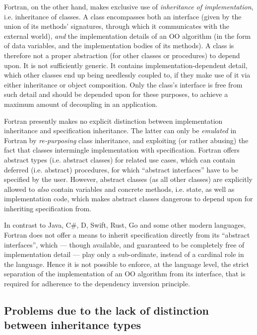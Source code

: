 \documentclass[11pt,oneside]{article}
\begin{document}
Fortran, on the other hand, makes exclusive use of \emph{inheritance
  of implementation}, i.e. inheritance of classes. A class encompasses
both an interface (given by the union of its methods' signatures,
through which it communicates with the external world), \emph{and} the
implementation details of an OO algorithm (in the form of data
variables, and the implementation bodies of its methods). A class is
therefore not a proper abstraction (for other classes or procedures)
to depend upon. It is not sufficiently generic. It contains
implementation-dependent detail, which other classes end up being
needlessly coupled to, if they make use of it via either inheritance
or object composition. Only the class's interface is free from such
detail and should be depended upon for these purposes, to achieve a
maximum amount of decoupling in an application.

Fortran presently makes no explicit distinction between implementation
inheritance and specification inheritance. The latter can only be
\emph{emulated} in Fortran by \emph{re-purposing} class inheritance,
and exploiting (or rather abusing) the fact that classes intermingle
implementation with specification. Fortran offers abstract types
(i.e. abstract classes) for related use cases, which can contain
deferred (i.e. abstract) procedures, for which ``abstract interfaces''
have to be specified by the user. However, abstract classes (as all
other classes) are explicitly allowed to \emph{also} contain variables
and concrete methods, i.e. state, as well as implementation code,
which makes abstract classes dangerous to depend upon for inheriting
specification from.

In contrast to Java, C\#, D, Swift, Rust, Go and some other modern
languages, Fortran does not offer a means to inherit specification
directly from its ``abstract interfaces'', which --- though available,
and guaranteed to be completely free of implementation detail --- play
only a sub-ordinate, instead of a cardinal role in the language. Hence
it is not possible to enforce, at the language level, the strict
separation of the implementation of an OO algorithm from its
interface, that is required for adherence to the dependency inversion
principle.

\subsection{Problems due to the lack of distinction between inheritance types}
\label{sect:problems}
\end{document}
